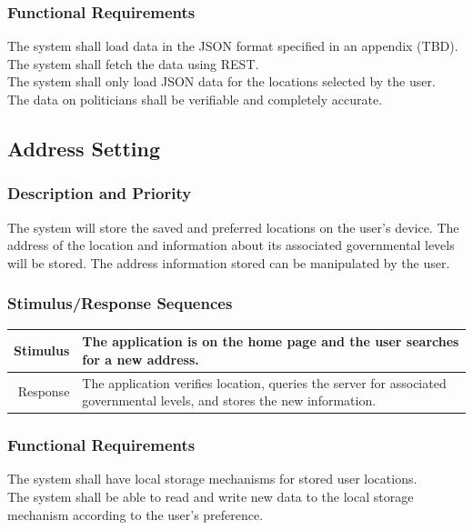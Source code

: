 \documentclass[12pt,oneside,letterpaper]{article}
\makeatletter
\newcounter{use_case}
\newcounter{functional_requirement}
\newcounter{tableline}
\newcommand{\functionalrequirementprinter}{\stepcounter{tableline}
\ifthenelse{\value{tableline}>1}{\refstepcounter{functional_requirement}
  FR-\arabic{functional_requirement}}{Requirement ID}&
}
\newenvironment{func_req}{
\setcounter{tableline}{0}
\begin{longtabu}{|@{\makebox[8em][r]{\functionalrequirementprinter}}|X|}
  \hline
  Description \\
}{
\end{longtabu}
}
\makeatother
\begin{document}
\subsubsection{Functional Requirements}
\begin{func_req}
  \hline
  The system shall load data in the JSON format specified in an appendix (TBD). \\
  \hline
  The system shall fetch the data using REST. \\
  \hline
  The system shall only load JSON data for the locations
  selected by the user. \\
  \hline
  The data on politicians shall be verifiable and completely accurate.\\
  \hline
\end{func_req}

\subsection{Address Setting}
\subsubsection{Description and Priority}
The system will store the saved and preferred locations on the user's
device. The address of the location and information about its
associated governmental levels will be stored. The address information
stored can be manipulated by the user.
\subsubsection{Stimulus/Response Sequences}
\begin{longtabu}{|r|X|}
  \hline
  Stimulus & The application is on the home page and the user searches for a new address. \\
  \hline
  Response & The application verifies location, queries the server for associated governmental levels, and stores the new information. \\
  \hline
\end{longtabu}
\subsubsection{Functional Requirements}
\begin{func_req}
  \hline
  The system shall have local storage mechanisms for stored user locations. \\
  \hline
  The system shall be able to read and write new data to the local storage mechanism according to the user's preference. \\
  \hline
\end{func_req}
\end{document}
